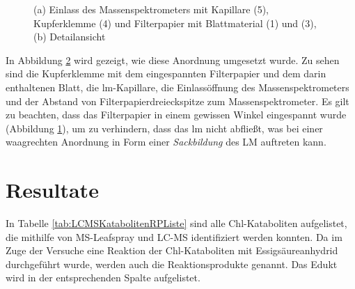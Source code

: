 \documentclass[12pt,a4paper]{article}
\begin{document}
\begin{figure}[htbp]
\begin{subfigure}[b]{0.5\textwidth}
    \caption{}
    \label{fig:MSLeafsprayDetail2}
  \end{subfigure}
  \caption[MS Leafspray Versuchsaufbau Detailfotos, Quelle: Autor]{(a) Einlass des Massenspektrometers mit Kapillare (5), Kupferklemme (4) und Filterpapier mit Blattmaterial (1) und (3), (b) Detailansicht}
  \label{fig:MSLeafsprayDetail}
\end{figure}

In Abbildung \ref{fig:MSLeafsprayDetail} wird gezeigt, wie diese Anordnung umgesetzt wurde. Zu sehen sind die Kupferklemme mit dem eingespannten Filterpapier und dem darin enthaltenen Blatt, die \gls{lm}-Kapillare, die Einlassöffnung des Massenspektrometers und der Abstand von Filterpapierdreieckspitze zum Massenspektrometer. Es gilt zu beachten, dass das Filterpapier in einem gewissen Winkel eingespannt wurde (Abbildung \ref{fig:MSLeafsprayDetail2}), um zu verhindern, dass das \gls{lm} nicht abfließt, was bei einer waagrechten Anordnung in Form einer \textit{Sackbildung} des LM auftreten kann.

\section{Resultate}

In Tabelle \ref{tab:LCMSKatabolitenRPListe} sind alle Chl-Kataboliten aufgelistet, die mithilfe von MS-Leafspray und LC-MS identifiziert werden konnten. Da im Zuge der Versuche eine Reaktion der Chl-Kataboliten mit Essigsäureanhydrid durchgeführt wurde, werden auch die Reaktionsprodukte genannt. Das Edukt wird in der entsprechenden Spalte aufgelistet.
\end{document}

